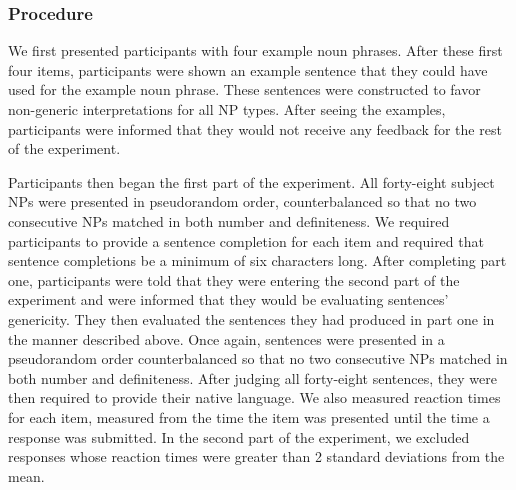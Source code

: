 \documentclass[10pt,letterpaper]{article}
\begin{document}
\subsubsection{Procedure} 

We first presented participants with four example noun phrases. After these first four items, participants were shown an example sentence that they could have used for the example noun phrase. These sentences were constructed to favor non-generic interpretations for all NP types. After seeing the examples, participants were informed that they would not receive any feedback for the rest of the experiment.

Participants then began the first part of the experiment. All forty-eight subject NPs were presented in pseudorandom order, counterbalanced so that no two consecutive NPs matched in both number and definiteness. We required participants to provide a sentence completion for each item and required that sentence completions be a minimum of six characters long. After completing part one, participants were told that they were entering the second part of the experiment and were informed that they would be evaluating sentences' genericity. They then evaluated the sentences they had produced in part one in the manner described above. Once again, sentences were presented in a pseudorandom order counterbalanced so that no two consecutive NPs matched in both number and definiteness. After judging all forty-eight sentences, they were then required to provide their native language. We also measured reaction times for each item, measured from the time the item was presented until the time a response was submitted. In the second part of the experiment, we excluded responses whose reaction times were greater than 2 standard deviations from the mean.

\end{document}

